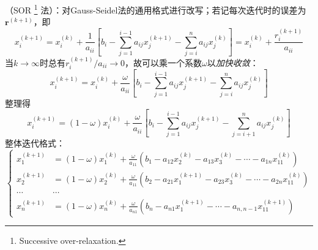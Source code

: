 \entry {}（SOR
\footnote{Successive over-relaxation.}
法）：对Gauss-Seidel法的通用格式进行改写；若记每次迭代时的误差为$\mathbf{r}^{(k+1)}$，即
\[x_i^{(k+1)}=x_i^{(k)}+\frac1{a_{ii}}\left[b_i-\sum_{j=1}^{i-1}a_{ij}x_j^{(k+1)}-\sum_{j=i}^na_{ij}x_j^{(k)}\right]=x_i^{(k)}+\frac{r_i^{(k+1)}}{a_{ii}}\]
当$k\to\infty$时总有$r_i^{(k+1)}/a_{ii}\to0$，故可以乘一个系数$\omega$以\emph{加快收敛}：
\[x_i^{(k+1)}=x_i^{(k)}+\frac\omega{a_{ii}}\left[b_i-\sum_{j=1}^{i-1}a_{ij}x_j^{(k+1)}-\sum_{j=i}^na_{ij}x_j^{(k)} \right] \]
整理得
\begin{equation}
x_i^{(k+1)}=(1-\omega)x_i^{(k)}+\frac\omega{a_{ii}}\left[b_i-\sum_{j=1}^{i-1}a_{ij}x_j^{(k+1)}-\sum_{j=i+1}^na_{ij}x_j^{(k)} \right]
\end{equation}
整体迭代格式：
\begin{equation}
\left\{
\begin{aligned}
x_1^{(k+1)}&=(1-\omega)x_1^{(k)}+\frac\omega{a_{11}}\left(b_1-a_{12}x_2^{(k)}-a_{13}x_3^{(k)}-\cdots-a_{1n}x_{11}^{(k)} \right)\\
x_2^{(k+1)}&=(1-\omega)x_2^{(k)}+\frac\omega{a_{11}}\left(b_2-a_{21}x_1^{(k+1)}-a_{23}x_3^{(k)}-\cdots-a_{2n}x_{11}^{(k)} \right)\\
\cdots&\cdots\\
x_n^{(k+1)}&=(1-\omega)x_n^{(k)}+\frac\omega{a_{n1}}\left(b_n-a_{n1}x_1^{(k+1)}-\cdots-a_{n,n-1}x_{11}^{(k+1)} \right)
\end{aligned}
\right.
\end{equation}

